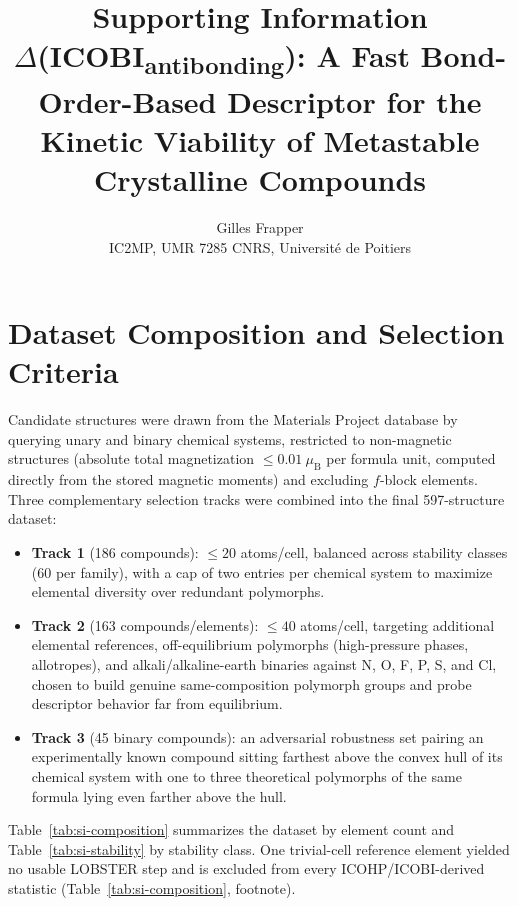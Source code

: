 \documentclass[11pt]{article}
\title{\bfseries Supporting Information\\[4pt]
\large $\Delta$(ICOBI\textsubscript{antibonding}): A Fast Bond-Order-Based
Descriptor for the Kinetic Viability of Metastable Crystalline Compounds}
\author{Gilles Frapper \\ IC2MP, UMR 7285 CNRS, Universit\'e de Poitiers}
\date{}
\begin{document}
\maketitle
\tableofcontents
\newpage

\section{Dataset Composition and Selection Criteria}
\label{sec:si-dataset}

Candidate structures were drawn from the Materials Project database by
querying unary and binary chemical systems, restricted to non-magnetic
structures (absolute total magnetization $\leq 0.01~\mu_\text{B}$ per
formula unit, computed directly from the stored magnetic moments) and
excluding $f$-block elements. Three complementary selection tracks were
combined into the final 597-structure dataset:

\begin{itemize}
  \item \textbf{Track 1} (186 compounds): $\leq 20$ atoms/cell, balanced
  across stability classes (60 per family), with a cap of two entries per
  chemical system to maximize elemental diversity over redundant polymorphs.
  \item \textbf{Track 2} (163 compounds/elements): $\leq 40$ atoms/cell,
  targeting additional elemental references, off-equilibrium polymorphs
  (high-pressure phases, allotropes), and alkali/alkaline-earth binaries
  against N, O, F, P, S, and Cl, chosen to build genuine same-composition
  polymorph groups and probe descriptor behavior far from equilibrium.
  \item \textbf{Track 3} (45 binary compounds): an adversarial robustness
  set pairing an experimentally known compound sitting farthest above the
  convex hull of its chemical system with one to three theoretical
  polymorphs of the same formula lying even farther above the hull.
\end{itemize}

Table~\ref{tab:si-composition} summarizes the dataset by element count and
Table~\ref{tab:si-stability} by stability class. One trivial-cell reference
element yielded no usable LOBSTER step and is excluded from every
ICOHP/ICOBI-derived statistic (Table~\ref{tab:si-composition}, footnote).
\end{document}
